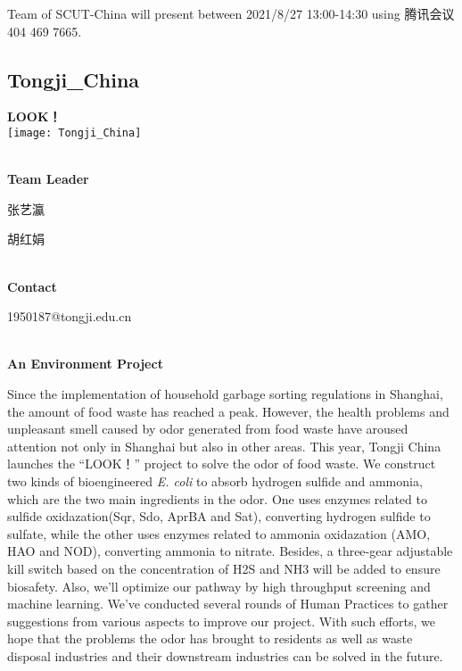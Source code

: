 Team of SCUT-China will present between 2021/8/27 13:00-14:30        using 腾讯会议 404 469 7665.
\newpage


\subsection{\textcolor{Blu}{ Tongji\_China } }
\vspace{5mm}
\begin{center}
\large{
  \textbf{ LOOK！ }\\

  \texttt{[image: Tongji\_China]}
}
\end{center}
\textbf{\\Team Leader}

  张艺瀛

  胡红娟


\textbf{\\Contact}

  1950187@tongji.edu.cn


\textbf{\\An Environment Project\\}\begin{spacing}{1.5}

Since the implementation of household garbage sorting regulations in Shanghai, the amount of food waste has reached a peak. However, the health problems and unpleasant smell caused by odor generated from food waste have aroused attention not only in Shanghai but also in other areas. This year, Tongji China launches the “LOOK！” project to solve the odor of food waste. We construct two kinds of bioengineered \textit{E. coli} to absorb hydrogen sulfide and ammonia, which are the two main ingredients in the odor. One uses enzymes related to sulfide oxidazation(Sqr, Sdo, AprBA and Sat), converting hydrogen sulfide to sulfate, while the other uses enzymes related to ammonia oxidazation (AMO, HAO and NOD), converting ammonia to nitrate. Besides, a three-gear adjustable kill switch based on the concentration of H2S and NH3 will be added to ensure biosafety. Also, we’ll optimize our pathway by high throughput screening and machine learning. We’ve conducted several rounds of Human Practices to gather suggestions from various aspects to improve our project. With such efforts, we hope that the problems the odor has brought to residents as well as waste disposal industries and their downstream industries can be solved in the future.\end{spacing}
\\


